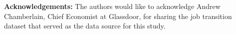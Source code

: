 \documentclass[10pt]{article}
\begin{document}
\textbf{Acknowledgements:} The authors would like to acknowledge Andrew Chamberlain, 
Chief Economist at Glassdoor, for sharing the job transition dataset that served 
as the data source for this study. 





\end{document}
